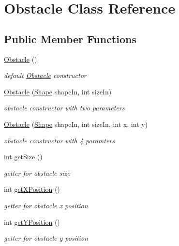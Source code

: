 \hypertarget{classObstacle}{\section{Obstacle Class Reference}
\label{classObstacle}
}
\subsection*{Public Member Functions}
\begin{DoxyCompactItemize}
\item 
\hyperlink{classObstacle_a8f734072321fa06a7b7dae2d5f50f352}{Obstacle} ()
\begin{DoxyCompactList}\small\item\em default \hyperlink{classObstacle}{Obstacle} constructor \end{DoxyCompactList}\item 
\hyperlink{classObstacle_af463124581a25af6f7592f43ccabd59c}{Obstacle} (\hyperlink{Obstacle_8h_a55b506070847a13554f8b879c1bfb37c}{Shape} shape\-In, int size\-In)
\begin{DoxyCompactList}\small\item\em obstacle constructor with two parameters \end{DoxyCompactList}\item 
\hyperlink{classObstacle_acee1329f562a8f51130555d6e9d3368d}{Obstacle} (\hyperlink{Obstacle_8h_a55b506070847a13554f8b879c1bfb37c}{Shape} shape\-In, int size\-In, int x, int y)
\begin{DoxyCompactList}\small\item\em obstacle constructor with 4 paramters \end{DoxyCompactList}\item 
int \hyperlink{classObstacle_ab7c0869e8610399c1cf01e59417a8284}{get\-Size} ()
\begin{DoxyCompactList}\small\item\em getter for obstacle size \end{DoxyCompactList}\item 
int \hyperlink{classObstacle_a7cabfaf3799e9a2a9e662ef9ec966f0d}{get\-X\-Position} ()
\begin{DoxyCompactList}\small\item\em getter for obstacle x position \end{DoxyCompactList}\item 
int \hyperlink{classObstacle_a8e643bcb824a6d60e57c8f538d737c69}{get\-Y\-Position} ()
\begin{DoxyCompactList}\small\item\em getter for obstacle y position \end{DoxyCompactList}\item 

\end{DoxyCompactItemize}
